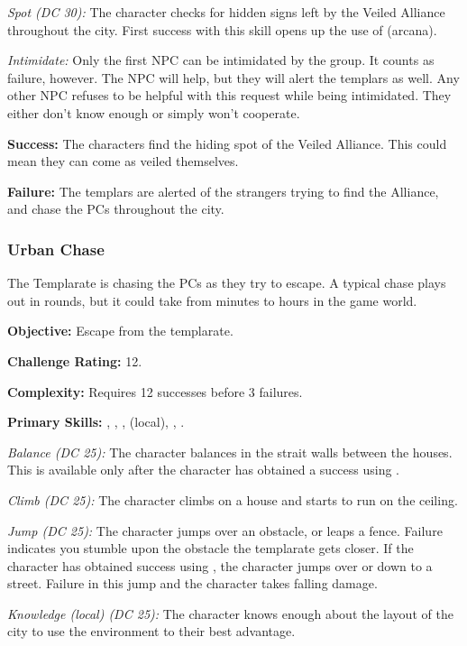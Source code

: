 \textit{Spot (DC 30):} The character checks for hidden signs left by the Veiled Alliance throughout the city. First success with this skill opens up the use of  (arcana).

\textit{Intimidate:} Only the first NPC can be intimidated by the group. It counts as failure, however. The NPC will help, but they will alert the templars as well. Any other NPC refuses to be helpful with this request while being intimidated. They either don't know enough or simply won't cooperate.

\textbf{Success:} The characters find the hiding spot of the Veiled Alliance. This could mean they can come as veiled themselves.

\textbf{Failure:} The templars are alerted of the strangers trying to find the Alliance, and chase the PCs throughout the city.

\subsubsection{Urban Chase}
The Templarate is chasing the PCs as they try to escape. A typical chase plays out in rounds, but it could take from minutes to hours in the game world.

\textbf{Objective:} Escape from the templarate.

\textbf{Challenge Rating:} 12.

\textbf{Complexity:} Requires 12 successes before 3 failures.

\textbf{Primary Skills:} , , ,  (local), , .

\textit{Balance (DC 25):} The character balances in the strait walls between the houses. This is available only after the character has obtained a success using .

\textit{Climb (DC 25):} The character climbs on a house and starts to run on the ceiling.

\textit{Jump (DC 25):} The character jumps over an obstacle, or leaps a fence. Failure indicates you stumble upon the obstacle the templarate gets closer. If the character has obtained success using , the character jumps over or down to a street. Failure in this jump and the character takes falling damage.

\textit{Knowledge (local) (DC 25):} The character knows enough about the layout of the city to use the environment to their best advantage.

